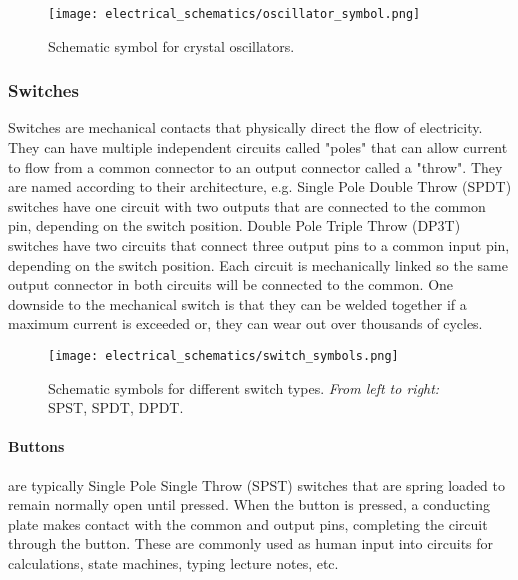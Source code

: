         \begin{figure}[h!]
            \texttt{[image: electrical\_schematics/oscillator\_symbol.png]}
            \caption[Oscillator Symbol]{Schematic symbol for crystal oscillators.}
        \end{figure}

        \subsubsection*{Switches}
        Switches are mechanical contacts that physically direct the flow of electricity.
        They can have multiple independent circuits called "poles" that can allow current to flow from a common connector to an output connector called a "throw".
        They are named according to their architecture, e.g. Single Pole Double Throw (SPDT) switches have one circuit with two outputs that are connected to the common pin, depending on the switch position.
        Double Pole Triple Throw (DP3T) switches have two circuits that connect three output pins to a common input pin, depending on the switch position.
        Each circuit is mechanically linked so the same output connector in both circuits will be connected to the common.
        One downside to the mechanical switch is that they can be welded together if a maximum current is exceeded or, they can wear out over thousands of cycles.


        \begin{figure}[h!]
            \texttt{[image: electrical\_schematics/switch\_symbols.png]}
            \caption[Switch Symbols]{Schematic symbols for different switch types.
            \emph{From left to right:} SPST, SPDT, DPDT.}
        \end{figure}

        \paragraph*{Buttons} are typically Single Pole Single Throw (SPST) switches that are spring loaded to remain normally open until pressed.
        When the button is pressed, a conducting plate makes contact with the common and output pins, completing the circuit through the button.
        These are commonly used as human input into circuits for calculations, state machines, typing lecture notes, etc.

